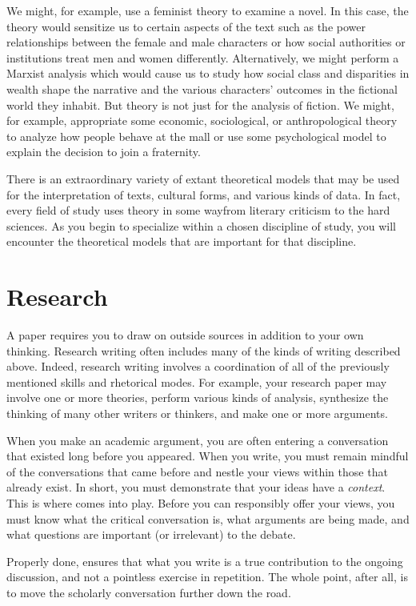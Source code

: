 We might, for example, use a feminist theory to examine a novel. In this case,
the theory would sensitize us to certain aspects of the text such as the power
relationships between the female and male characters or how social authorities
or institutions treat men and women differently. Alternatively, we might perform
a Marxist analysis which would cause us to study how social class and
disparities in wealth shape the narrative and the various characters' outcomes
in the fictional world they inhabit. But theory is not just for the analysis of
fiction. We might, for example, appropriate some economic, sociological, or
anthropological theory to analyze how people behave at the mall or use some
psychological model to explain the decision to join a fraternity.

There is an extraordinary variety of extant theoretical models that may be used
for the interpretation of texts, cultural forms, and various kinds of data. In
fact, every field of study uses theory in some way\textemdash from literary
criticism to the hard sciences. As you begin to specialize within a chosen
discipline of study, you will encounter the theoretical models that are
important for that discipline.

\hypertarget{researchessay}{} \section{Research}

A \hyperlink{academicresearch}{\color{Ahrenge}{research}} paper requires you to
draw on outside sources in addition to your own thinking. Research writing often
includes many of the kinds of writing described above. Indeed, research writing
involves a coordination of all of the previously mentioned skills and rhetorical
modes. For example, your research paper may involve one or more theories,
perform various kinds of analysis, synthesize the thinking of many other writers
or thinkers, and make one or more arguments.

When you make an academic argument, you are often entering a conversation that
existed long before you appeared. When you write, you must remain mindful of the
conversations that came before and nestle your views within those that already
exist. In short, you must demonstrate that your ideas have a \emph{context}.
This is where \hyperlink{academicresearch}{\color{Ahrenge}{research}} comes into
play. Before you can responsibly offer your views, you must know what the
critical conversation is, what arguments are being made, and what questions are
important (or irrelevant) to the debate.

Properly done, \hyperlink{academicresearch}{\color{Ahrenge}{research}} ensures
that what you write is a true contribution to the ongoing discussion, and not a
pointless exercise in repetition. The whole point, after all, is to move the
scholarly conversation further down the road.
